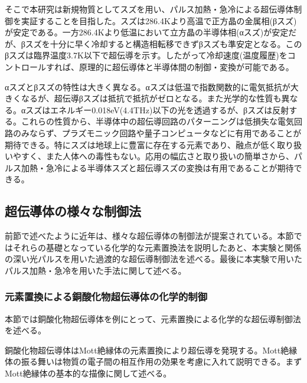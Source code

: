 そこで本研究は新規物質としてスズを用い、パルス加熱・急冷による超伝導体制御を実証することを目指した。スズは286.4Kより高温で正方晶の金属相(βスズ)が安定である。一方286.4Kより低温において立方晶の半導体相(αスズ)が安定だが、βスズを十分に早く冷却すると構造相転移できずβスズも準安定となる。このβスズは臨界温度3.7K以下で超伝導を示す。したがって冷却速度(温度履歴)をコントロールすれば、原理的に超伝導体と半導体間の制御・変換が可能である。

αスズとβスズの特性は大きく異なる。αスズは低温で指数関数的に電気抵抗が大きくなるが、超伝導βスズは抵抗で抵抗がゼロとなる。また光学的な性質も異なる。αスズはエネルギー0.018eV(4.4THz)以下の光を透過するが、βスズは反射する。これらの性質から、半導体中の超伝導回路のパターニングは低損失な電気回路のみならず、プラズモニック回路や量子コンピュータなどに有用であることが期待できる。特にスズは地球上に豊富に存在する元素であり、融点が低く取り扱いやすく、また人体への毒性もない。応用の幅広さと取り扱いの簡単さから、パルス加熱・急冷による半導体スズと超伝導スズの変換は有用であることが期待できる。

\subsection{超伝導体の様々な制御法}
前節で述べたように近年は、様々な超伝導体の制御法が提案されている。本節ではそれらの基礎となっている化学的な元素置換法を説明したあと、本実験と関係の深い光パルスを用いた過渡的な超伝導制御法を述べる。最後に本実験で用いたパルス加熱・急冷を用いた手法に関して述べる。

\subsubsection{元素置換による銅酸化物超伝導体の化学的制御}
本節では銅酸化物超伝導体を例にとって、元素置換による化学的な超伝導制御法を述べる。

銅酸化物超伝導体はMott絶縁体の元素置換により超伝導を発現する\cite{Lee2006}。Mott絶縁体の振る舞いは物質の電子間の相互作用の効果を考慮に入れて説明できる。まずMott絶縁体の基本的な描像に関して述べる。

